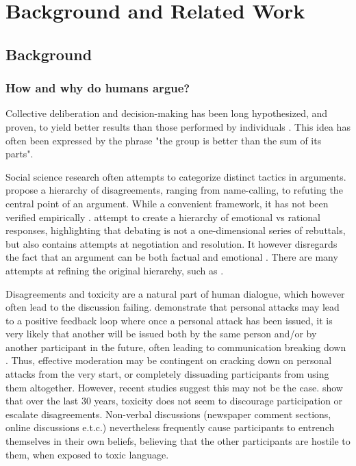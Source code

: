 %
\chapter{Background and Related Work}
\label{sec:related}

\section{Background}
\label{sec:related:sec1}


\subsection{How and why do humans argue?}
\label{sec:background:arguments-how}

Collective deliberation and decision-making has been long hypothesized, and proven, to yield better results than those performed by individuals \cite{david-collaborative, stefan-dissent}. This idea has often been expressed by the phrase "the group is better than the sum of its parts". 

Social science research often attempts to categorize distinct tactics in arguments. \cite{graham2008disagree} propose a hierarchy of disagreements, ranging from name-calling, to refuting the central point of an argument.  While a convenient framework, it has not been verified empirically \cite{dekock2022disagree}. \cite{walker-etal-2012-corpus} attempt to create a hierarchy of emotional vs rational responses, highlighting that debating is not a one-dimensional series of rebuttals, but also contains attempts at negotiation and resolution. It however disregards the fact that an argument can be both factual and emotional \cite{dekock2022disagree}. There are many attempts at refining the original hierarchy, such as \cite{benesch2016counterspeech}.

Disagreements and toxicity are a natural part of human dialogue, which however often lead to the discussion failing. \cite{dekock2022disagree} demonstrate that personal attacks may lead to a positive feedback loop where once a personal attack has been issued, it is very likely that another will be issued both by the same person and/or by another participant in the future, often leading to communication breaking down . Thus, effective moderation may be contingent on cracking down on personal attacks from the very start, or completely dissuading participants from using them altogether. However, recent studies suggest this may not be the case. \cite{Avalle2024PersistentIP} show that over the last 30 years, toxicity does not seem to discourage participation or escalate disagreements. Non-verbal discussions (newspaper comment sections, online discussions e.t.c.) nevertheless frequently cause participants to entrench themselves in their own beliefs, believing that the other participants are hostile to them, when exposed to toxic language.

